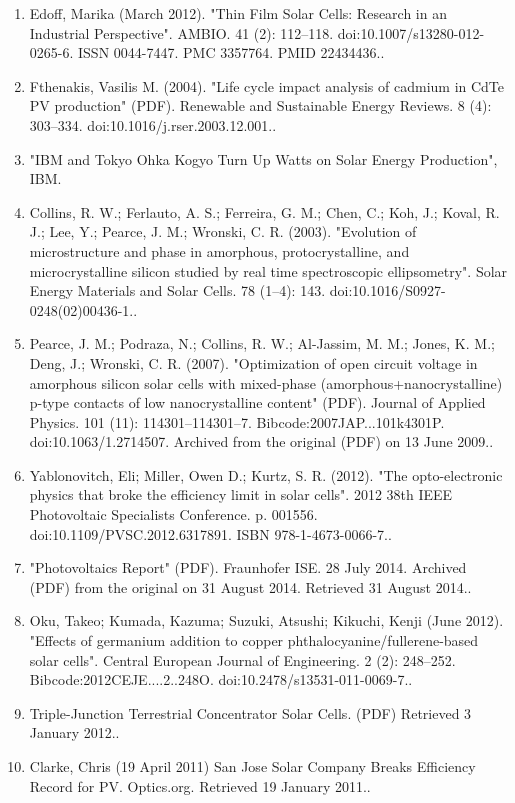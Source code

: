 \begin{enumerate}
\item Edoff, Marika (March 2012). "Thin Film Solar Cells: Research in an Industrial Perspective". AMBIO. 41 (2): 112–118. doi:10.1007/s13280-012-0265-6. ISSN 0044-7447. PMC 3357764. PMID 22434436..
\item Fthenakis, Vasilis M. (2004). "Life cycle impact analysis of cadmium in CdTe PV production" (PDF). Renewable and Sustainable Energy Reviews. 8 (4): 303–334. doi:10.1016/j.rser.2003.12.001..
\item "IBM and Tokyo Ohka Kogyo Turn Up Watts on Solar Energy Production", IBM.
\item Collins, R. W.; Ferlauto, A. S.; Ferreira, G. M.; Chen, C.; Koh, J.; Koval, R. J.; Lee, Y.; Pearce, J. M.; Wronski, C. R. (2003). "Evolution of microstructure and phase in amorphous, protocrystalline, and microcrystalline silicon studied by real time spectroscopic ellipsometry". Solar Energy Materials and Solar Cells. 78 (1–4): 143. doi:10.1016/S0927-0248(02)00436-1..
\item Pearce, J. M.; Podraza, N.; Collins, R. W.; Al-Jassim, M. M.; Jones, K. M.; Deng, J.; Wronski, C. R. (2007). "Optimization of open circuit voltage in amorphous silicon solar cells with mixed-phase (amorphous+nanocrystalline) p-type contacts of low nanocrystalline content" (PDF). Journal of Applied Physics. 101 (11): 114301–114301–7. Bibcode:2007JAP...101k4301P. doi:10.1063/1.2714507. Archived from the original (PDF) on 13 June 2009..
\item Yablonovitch, Eli; Miller, Owen D.; Kurtz, S. R. (2012). "The opto-electronic physics that broke the efficiency limit in solar cells". 2012 38th IEEE Photovoltaic Specialists Conference. p. 001556. doi:10.1109/PVSC.2012.6317891. ISBN 978-1-4673-0066-7..
\item "Photovoltaics Report" (PDF). Fraunhofer ISE. 28 July 2014. Archived (PDF) from the original on 31 August 2014. Retrieved 31 August 2014..
\item Oku, Takeo; Kumada, Kazuma; Suzuki, Atsushi; Kikuchi, Kenji (June 2012). "Effects of germanium addition to copper phthalocyanine/fullerene-based solar cells". Central European Journal of Engineering. 2 (2): 248–252. Bibcode:2012CEJE....2..248O. doi:10.2478/s13531-011-0069-7..
\item Triple-Junction Terrestrial Concentrator Solar Cells. (PDF) Retrieved 3 January 2012..
\item Clarke, Chris (19 April 2011) San Jose Solar Company Breaks Efficiency Record for PV. Optics.org. Retrieved 19 January 2011..

\end{enumerate}
